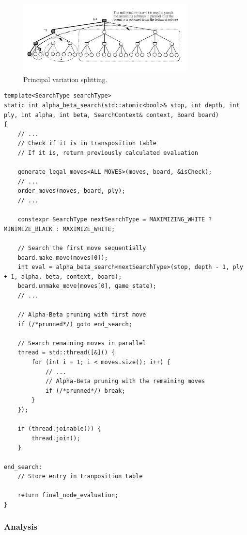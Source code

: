 \begin{figure}[H]
    \centering
    \includegraphics[width=0.8\textwidth]{Imagenes/Bitmap/pvsplitting.png}
    \caption{Principal variation splitting.~\cite{PVSplitting}}
    \label{fig:pv-splitting}
\end{figure}

\begin{lstlisting}[breaklines=true, frame=single]
template<SearchType searchType>
static int alpha_beta_search(std::atomic<bool>& stop, int depth, int ply, int alpha, int beta, SearchContext& context, Board board)
{
    // ...
    // Check if it is in transposition table
    // If it is, return previously calculated evaluation

    generate_legal_moves<ALL_MOVES>(moves, board, &isCheck);
    // ...
    order_moves(moves, board, ply);
    // ...
    
    constexpr SearchType nextSearchType = MAXIMIZING_WHITE ? MINIMIZE_BLACK : MAXIMIZE_WHITE;

    // Search the first move sequentially
    board.make_move(moves[0]);
    int eval = alpha_beta_search<nextSearchType>(stop, depth - 1, ply + 1, alpha, beta, context, board);
    board.unmake_move(moves[0], game_state);
    // ...

    // Alpha-Beta pruning with first move
    if (/*prunned*/) goto end_search;

    // Search remaining moves in parallel
    thread = std::thread([&]() {
        for (int i = 1; i < moves.size(); i++) {
            // ...
            // Alpha-Beta pruning with the remaining moves
            if (/*prunned*/) break;
        }
    });
    
    if (thread.joinable()) {
        thread.join();
    }

end_search:
    // Store entry in tranposition table

    return final_node_evaluation;
}
\end{lstlisting}

\subsubsection{Analysis}

